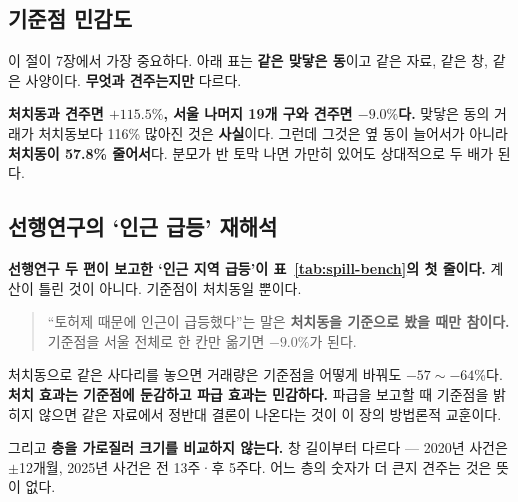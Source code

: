 \subsection{기준점 민감도}

이 절이 7장에서 가장 중요하다. 아래 표는 \textbf{같은 맞닿은 동}이고 같은 자료,
같은 창, 같은 사양이다. \textbf{무엇과 견주는지만} 다르다.



\textbf{처치동과 견주면 $+115.5\%$, 서울 나머지 19개 구와 견주면 $-9.0\%$다.}
맞닿은 동의 거래가 처치동보다 116\% 많아진 것은 \textbf{사실}이다. 그런데 그것은
옆 동이 늘어서가 아니라 \textbf{처치동이 57.8\% 줄어서}다. 분모가 반 토막 나면
가만히 있어도 상대적으로 두 배가 된다.

\subsection{선행연구의 `인근 급등' 재해석}

\textbf{선행연구 두 편이 보고한 `인근 지역 급등'이 표~\ref{tab:spill-bench}의
첫 줄이다.} 계산이 틀린 것이 아니다. 기준점이 처치동일 뿐이다.

\begin{quote}
``토허제 때문에 인근이 급등했다''는 말은 \textbf{처치동을 기준으로 봤을 때만
참이다.} 기준점을 서울 전체로 한 칸만 옮기면 $-9.0\%$가 된다.
\end{quote}

처치동으로 같은 사다리를 놓으면 거래량은 기준점을 어떻게 바꿔도
$-57 \sim -64\%$다. \textbf{처치 효과는 기준점에 둔감하고 파급 효과는 민감하다.}
파급을 보고할 때 기준점을 밝히지 않으면 같은 자료에서 정반대 결론이 나온다는
것이 이 장의 방법론적 교훈이다.

그리고 \textbf{층을 가로질러 크기를 비교하지 않는다.} 창 길이부터 다르다 ---
2020년 사건은 $\pm$12개월, 2025년 사건은 전 13주·후 5주다. 어느 층의 숫자가 더
큰지 견주는 것은 뜻이 없다.
